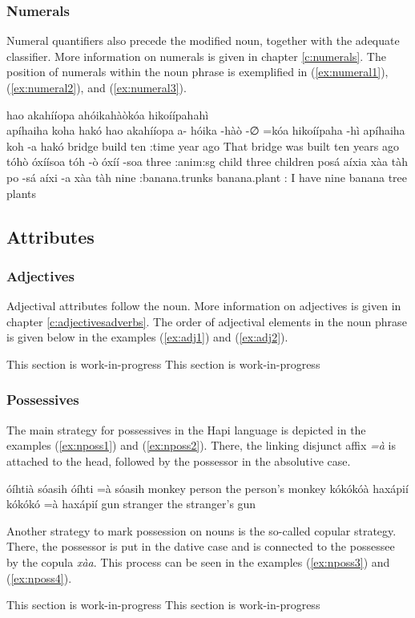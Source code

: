 \documentclass[a4paper, 12pt, oneside]{memoir}
\newcommand{\emh}[1]{\textit{#1}}
\begin{document}
\subsubsection{Numerals}
Numeral quantifiers also precede the modified noun, together with the adequate classifier. More information on numerals is given in chapter \ref{c:numerals}.  The position of numerals within the noun phrase is exemplified in (\ref{ex:numeral1}), (\ref{ex:numeral2}), and (\ref{ex:numeral3}).
\begin{examples}
\ex \label{ex:numeral1} 
\words hao akahííopa ahóikahàòkóa hikoíípahahì \\ {apíhaiha koha} hakó
\bits hao akahííopa a- hóika -hàò -∅ =kóa  hikoíípaha -hì {apíhaiha koh} -a hakó
\gloss {\Dem} bridge {\Pass} build {\Dpasto} {\St} {\Decl} ten {\Cl}:time year {\Pl} ago
\tr That bridge was built ten years ago
\ex \label{ex:numeral2}
\words tóhò óxíísoa
\bits tóh -ò óxíí -soa
\gloss three {\Cl}:anim:sg child {\Pl}
\tr three children
\ex \label{ex:numeral3}
\words posá aíxia xàa tàh
\bits po -sá aíxi -a xàa tàh
\gloss nine {\Cl}:banana.trunks banana.plant {\Pl} {\Cop} {\Fs}:{\Dat}
\tr I have nine banana tree plants
\end{examples}
\subsection{Attributes}\label{sattributes}
\subsubsection{Adjectives}
Adjectival attributes follow the noun. More information on adjectives is given in chapter \ref{c:adjectivesadverbs}. The order of adjectival elements in the noun phrase is given below in the examples (\ref{ex:adj1}) and (\ref{ex:adj2}).
\begin{examples}
\ex \label{ex:adj1}
This section is work-in-progress
\ex \label{ex:adj2}
This section is work-in-progress
\end{examples}
\subsubsection{Possessives}
The main strategy for possessives in the Hapi language is depicted in the examples (\ref{ex:nposs1}) and (\ref{ex:nposs2}). There, the linking disjunct affix \emh{=à} is attached to the head, followed by the possessor in the absolutive case. 
\begin{examples}
\ex \label{ex:nposs1}
\words óíhtià sóasih
\bits óíhti =à sóasih
\gloss monkey {\Link} person
\tr the person's monkey
\ex \label{ex:nposs2}
\words kókókóà haxápií
\bits kókókó =à haxápií
\gloss gun {\Link} stranger
\tr the stranger's gun
\end{examples}
Another strategy to mark possession on nouns is the so-called copular strategy. There, the possessor is put in the dative case and is connected to the possessee by the copula \emh{xàa}. This process can be seen in the examples (\ref{ex:nposs3}) and (\ref{ex:nposs4}).
\begin{examples}
\ex \label{ex:nposs3}
This section is work-in-progress
\ex \label{ex:nposs4}
This section is work-in-progress
\end{examples}
\end{document}
